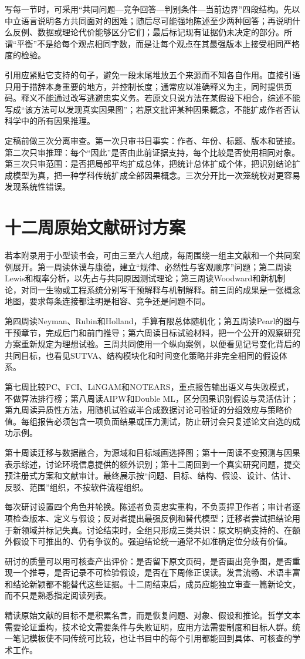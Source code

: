写每一节时，可采用“共同问题---竞争回答---判别条件---当前边界”四段结构。先以中立语言说明各方共同面对的困难；随后尽可能强地陈述至少两种回答；再说明什么反例、数据或理论代价能够区分它们；最后标记现有证据仍未决定的部分。所谓“平衡”不是给每个观点相同字数，而是让每个观点在其最强版本上接受相同严格度的检验。

引用应紧贴它支持的句子，避免一段末尾堆放五个来源而不知各自作用。直接引语只用于措辞本身重要的地方，并控制长度；通常应以准确释义为主，同时提供页码。释义不能通过改写逃避忠实义务。若原文只说方法在某假设下相合，综述不能写成“该方法可以发现真实因果图”；若原文批评某种因果概念，不能扩成作者否认科学中的所有因果推理。

定稿前做三次分离审查。第一次只审书目事实：作者、年份、标题、版本和链接。第二次只审推理：每个“因此”是否由此前证据支持，每个比较是否使用相同对象。第三次只审范围：是否把局部平均扩成总体，把统计总体扩成个体，把识别结论扩成模型为真，把一种学科传统扩成全部因果概念。三次分开比一次笼统校对更容易发现系统性错误。

\section{十二周原始文献研讨方案}

若本附录用于小型读书会，可由三至六人组成，每周围绕一组主文献和一个共同案例展开。第一周读休谟与康德，建立“规律、必然性与客观顺序”问题；第二周读Lewis和概率分析，以先占与共同原因测试理论；第三周读Woodward和新机制论，对同一生物或工程系统分别写干预解释与机制解释。前三周的成果是一张概念地图，要求每条连接都注明是相容、竞争还是问题不同。

第四周读Neyman、Rubin和Holland，手算有限总体随机化；第五周读Pearl的图与干预章节，完成后门和前门推导；第六周读目标试验材料，把一个公开的观察研究方案重新规定为理想试验。三周共同使用一个纵向案例，以便看见记号变化背后的共同目标，也看见SUTVA、结构模块化和时间变化策略并非完全相同的假设体系。

第七周比较PC、FCI、LiNGAM和NOTEARS，重点报告输出语义与失败模式，不做算法排行榜；第八周读AIPW和Double ML，区分因果识别假设与灵活估计；第九周读异质性方法，用随机试验或半合成数据讨论可验证的分组效应与策略价值。每组报告必须包含一项负面结果或压力测试，防止研讨会只复述论文自选的成功示例。

第十周读迁移与数据融合，为源域和目标域画选择图；第十一周读不变预测与因果表示综述，讨论环境信息提供的额外识别；第十二周回到一个真实研究问题，提交预注册式方案和文献审计。最终展示按“问题、目标、结构、假设、设计、估计、反驳、范围”组织，不按软件流程组织。

每次研讨设置四个角色并轮换。陈述者负责忠实重构，不负责捍卫作者；审计者逐项检查版本、定义与假设；反对者提出最强反例和替代模型；迁移者尝试把结论用于新领域并标记失真。讨论结束时，全组只形成三类共识：原文明确支持的、在额外假设下可推出的、仍有争议的。强迫结论统一通常不如准确定位分歧有价值。

研讨的质量可以用可核查产出评价：是否留下原文页码，是否画出竞争图，是否重现一个推导，是否记录不可检验假设，是否在下周修正误读。发言流畅、术语丰富和结论新颖都不能替代这些证据。十二周结束后，成员应能独立审查一篇新论文，而不只是熟悉指定阅读列表。

\begin{chapterreview}
精读原始文献的目标不是积累名言，而是恢复问题、对象、假设和推论。哲学文本需要论证重构，技术论文需要条件与失败证明，应用方法需要制度和目标人群。统一笔记模板使不同传统可比较，也让书目中的每个引用都能回到具体、可核查的学术工作。
\end{chapterreview}

